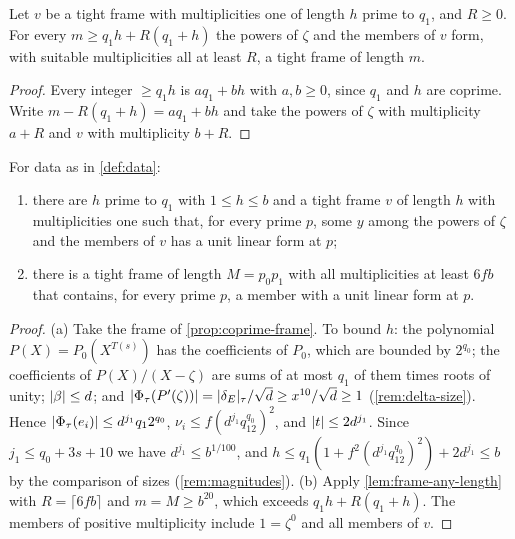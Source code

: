 \begin{lemma}\label{lem:frame-any-length}
Let $v$ be a tight frame with multiplicities one of length $h$ prime to $q_1$, and $R\ge0$. For every
$m\ge q_1h+R(q_1+h)$ the powers of $\zeta$ and the members of $v$ form, with suitable multiplicities all
at least $R$, a tight frame of length $m$.
\end{lemma}

\begin{proof}
Every integer $\ge q_1h$ is $aq_1+bh$ with $a,b\ge0$, since $q_1$ and $h$ are coprime. Write
$m-R(q_1+h)=aq_1+bh$ and take the powers of $\zeta$ with multiplicity $a+R$ and $v$ with multiplicity
$b+R$.
\end{proof}

\begin{theorem}\label{thm:frames-data}
For data as in \cref{def:data}:
\begin{enumerate}[label=\textup{(\alph*)}]
\item there are $h$ prime to $q_1$ with $1\le h\le b$ and a tight frame $v$ of length $h$ with
multiplicities one such that, for every prime $p$, some $y$ among the powers of $\zeta$ and the members
of $v$ has a unit linear form at $p$;
\item there is a tight frame of length $M=p_0p_1$ with all multiplicities at least $6fb$ that contains,
for every prime $p$, a member with a unit linear form at $p$.
\end{enumerate}
\end{theorem}

\begin{proof}
(a) Take the frame of \cref{prop:coprime-frame}. To bound $h$: the polynomial $P(X)=P_0(X^{T(s)})$ has
the coefficients of $P_0$, which are bounded by $2^{q_0}$; the coefficients of $P(X)/(X-\zeta)$ are
sums of at most $q_1$ of them times roots of unity; $\lvert \beta\rvert\le d$; and $\lvert \Phi_\tau(P'(\zeta))\rvert=
\lvert \delta_E\rvert_\tau/\sqrt d\ge x^{10}/\sqrt d\ge1$ (\cref{rem:delta-size}). Hence
$\lvert \Phi_\tau(e_i)\rvert\le d^{j_1}q_12^{q_0}$, $\nu_i\le f(d^{j_1}q_12^{q_0})^2$, and $\lvert t\rvert\le2d^{j_1}$.
Since $j_1\le q_0+3s+10$ we have $d^{j_1}\le b^{1/100}$, and $h\le q_1(1+f^2(d^{j_1}q_12^{q_0})^2)
+2d^{j_1}\le b$ by the comparison of sizes (\cref{rem:magnitudes}).
(b) Apply \cref{lem:frame-any-length} with $R=\lceil6fb\rceil$ and $m=M\ge b^{20}$, which exceeds
$q_1h+R(q_1+h)$. The members of positive multiplicity include $1=\zeta^0$ and all members of $v$.
\end{proof}

